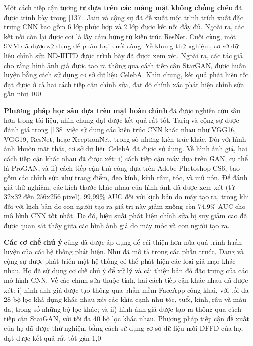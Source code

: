 \documentclass{article}
\begin{document}
Một cách tiếp cận tương tự \textbf{dựa trên các mảng mặt không chồng chéo} đã được trình bày trong [137]. Jain và cộng sự đã đề xuất một trình trích xuất đặc trưng CNN bao gồm 6 lớp phức hợp và 2 lớp được kết nối đầy đủ. Ngoài ra, các kết nối còn lại được coi là lấy cảm hứng từ kiến trúc ResNet. Cuối cùng, một SVM đã được sử dụng để phân loại cuối cùng. Về khung thử nghiệm, cơ sở dữ liệu chỉnh sửa ND-IIITD được trình bày đã được xem xét. Ngoài ra, các tác giả cho rằng hình ảnh giả được tạo ra thông qua cách tiếp cận StarGAN, được huấn luyện bằng cách sử dụng cơ sở dữ liệu CelebA. Nhìn chung, kết quả phát hiện tốt đạt được ở cả hai cách tiếp cận chỉnh sửa, đạt độ chính xác phát hiện chỉnh sửa gần như 100%

\textbf{Phương pháp học sâu dựa trên mặt hoàn chỉnh} đã được nghiên cứu sâu hơn trong tài liệu, nhìn chung đạt được kết quả rất tốt. Tariq và cộng sự được đánh giá trong [138] việc sử dụng các kiến trúc CNN khác nhau như VGG16, VGG19, ResNet, hoặc XceptionNet, trong số những kiến trúc khác. Đối với hình ảnh khuôn mặt thật, cơ sở dữ liệu CelebA đã được sử dụng. Về hình ảnh giả, hai cách tiếp cận khác nhau đã được xét: i) cách tiếp cận máy dựa trên GAN, cụ thể là ProGAN, và ii) cách tiếp cận thủ công dựa trên Adobe Photoshop CS6, bao gồm các chỉnh sửa như trang điểm, đeo kính, kính râm, tóc, và mũ nón. Để đánh giá thử nghiệm, các kích thước khác nhau của hình ảnh đã được xem xét (từ 32x32 đến 256x256 pixel). 99,99\% AUC đối với kịch bản do máy tạo ra, trong khi đối với kịch bản do con người tạo ra giá trị này giảm xuống còn 74,9\% AUC cho mô hình CNN tốt nhất. Do đó, hiệu suất phát hiện chỉnh sửa bị suy giảm cao đã được quan sát thấy giữa các hình ảnh giả do máy móc và con người tạo ra.

\textbf{Các cơ chế chú ý} cũng đã được áp dụng để cải thiện hơn nữa quá trình huấn luyện của các hệ thống phát hiện. Như đã mô tả trong các phần trước, Dang và cộng sự được phát triển một hệ thống có thể phát hiện các loại giả mạo khác nhau. Họ đã sử dụng cơ chế chú ý để xử lý và cải thiện bản đồ đặc trưng của các mô hình CNN. Về các chỉnh sửa thuộc tính, hai cách tiếp cận khác nhau đã được xét: i) hình ảnh giả được tạo thông qua phần mềm FaceApp công khai, với tối đa 28 bộ lọc khả dụng khác nhau xét các khía cạnh như tóc, tuổi, kính, râu và màu da, trong số những bộ lọc khác; và ii) hình ảnh giả được tạo ra thông qua cách tiếp cận StarGAN, với tối đa 40 bộ lọc khác nhau. Phương pháp tiếp cận đề xuất của họ đã được thử nghiệm bằng cách sử dụng cơ sở dữ liệu mới DFFD của họ, đạt được kết quả rất tốt gần 1,0%
\end{document}
